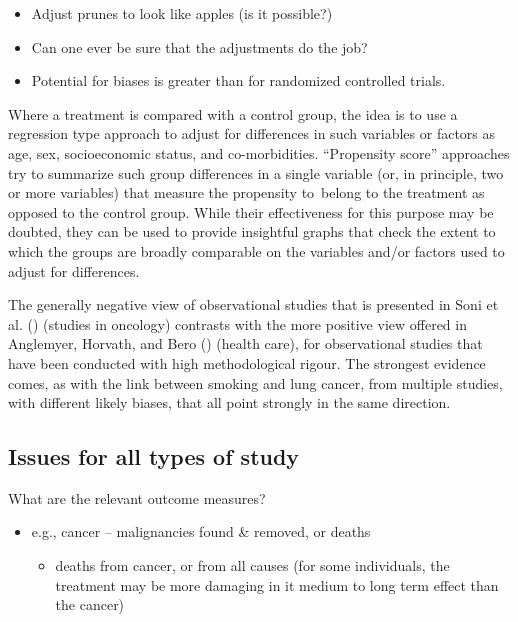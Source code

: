 \documentclass[
  10ptls,
  b5paper]{book}
\providecommand{\tightlist}{%
  \setlength{\itemsep}{0pt}\setlength{\parskip}{0pt}}
\begin{document}
\begin{itemize}
\tightlist
\item
  Adjust prunes to look like apples (is it possible?)
\item
  Can one ever be sure that the adjustments do the job?
\item
  Potential for biases is greater than for randomized controlled trials.
\end{itemize}

Where a treatment is compared with a control group, the idea is to use a regression type approach to adjust for differences in such variables or factors as age, sex, socioeconomic status, and co-morbidities. ``Propensity score'' approaches try to summarize such group differences in a single variable (or, in principle, two or more variables) that measure the propensity to~belong to the treatment as opposed to the control group. While their effectiveness for this purpose may be doubted, they can be used to provide insightful graphs that check the extent to which the groups are broadly comparable on the variables and/or factors used to adjust for differences.

The generally negative view of observational studies that is presented in Soni et al. () (studies in oncology) contrasts with the more positive view offered in Anglemyer, Horvath, and Bero () (health care), for observational studies that have been conducted with high methodological rigour. The strongest evidence comes, as with the link between smoking and lung cancer, from multiple studies, with different likely biases, that all point strongly in the same direction.

\subsection*{Issues for all types of study}\label{issues-for-all-types-of-study}

What are the relevant outcome measures?

\begin{itemize}
\tightlist
\item
  e.g., cancer -- malignancies found \& removed, or deaths

  \begin{itemize}
  \tightlist
  \item
    deaths from cancer, or from all causes (for some individuals, the treatment may be more damaging in it medium to long term effect than the cancer)
  \end{itemize}
\end{itemize}
\end{document}
